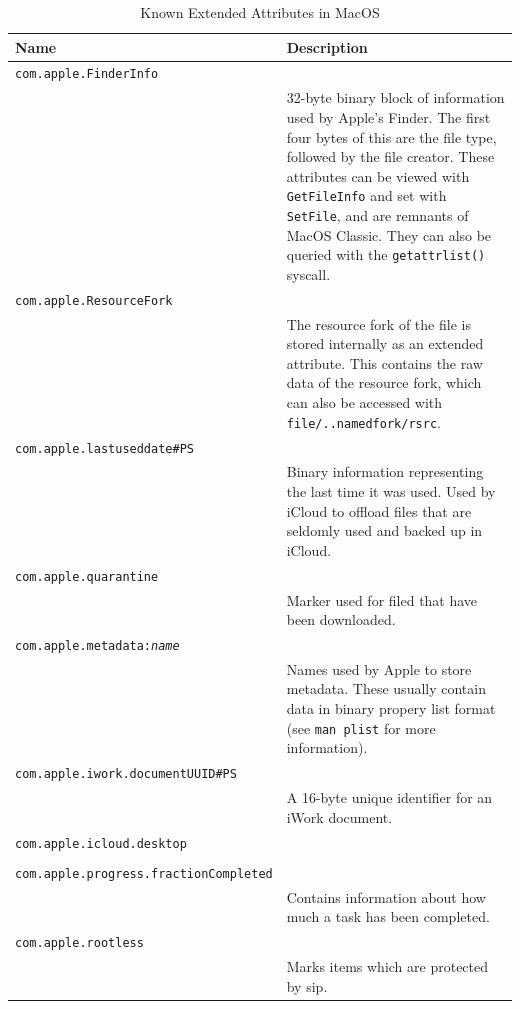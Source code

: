 \documentclass[a4paper]{article}
\begin{document}
\begin{table}
\renewcommand{\arraystretch}{1.25}
\centering
\caption{Known Extended Attributes in MacOS}
\label{tbl:macosxattr}
\begin{tabular}{@{}p{1cm}p{10cm}@{}}
\toprule
Name & Description\\
\midrule
\texttt{com.apple.FinderInfo}\\
& 32-byte binary block of information used by Apple's Finder. The first four bytes of this are the file type, followed by the file creator. These attributes can be viewed with \verb|GetFileInfo| and set with \verb|SetFile|, and are remnants of MacOS Classic. They can also be queried with the \verb|getattrlist()| syscall.\\
\texttt{com.apple.ResourceFork}\\
& The resource fork of the file is stored internally as an extended attribute. This contains the raw data of the resource fork, which can also be accessed with \texttt{file/..namedfork/rsrc}.\\
\texttt{com.apple.lastuseddate\#PS}\\
& Binary information representing the last time it was used. Used by iCloud to offload files that are seldomly used and backed up in iCloud.\\
\texttt{com.apple.quarantine}\\
& Marker used for filed that have been downloaded.\\
\texttt{com.apple.metadata:\emph{name}}\\
& Names used by Apple to store metadata. These usually contain data in binary propery list format (see \texttt{man plist} for more information).\\
\texttt{com.apple.iwork.documentUUID\#PS}\\
& A 16-byte unique identifier for an iWork document.\\
\texttt{com.apple.icloud.desktop}\\
& \\
\texttt{com.apple.progress.fractionCompleted}\\
& Contains information about how much a task has been completed.\\
\texttt{com.apple.rootless}\\
& Marks items which are protected by \gls{sip}.\\
\bottomrule
\end{tabular}
\end{table}

\end{document}
